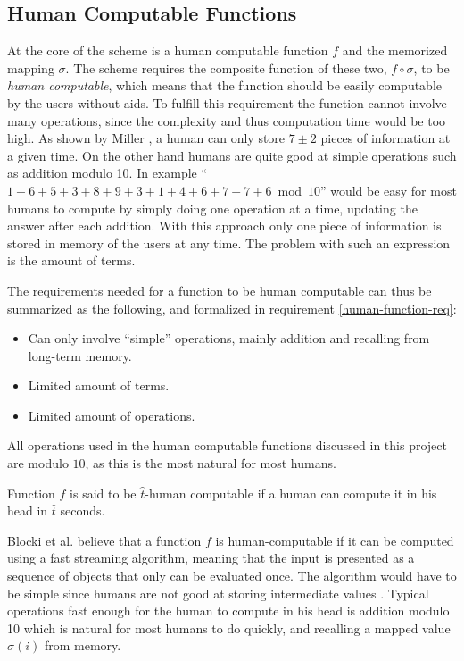 \subsection{Human Computable Functions}\label{human-func}
At the core of the scheme is a human computable function $f$ and the memorized mapping $\sigma$. The scheme requires the composite function of these two, $f \circ \sigma$, to be \emph{human computable}, which means that the function should be easily computable by the users without aids. To fulfill this requirement the function cannot involve many operations, since the complexity and thus computation time would be too high. As shown by Miller \cite{magic-seven_miller}, a human can only store $7 \pm 2$ pieces of information at a given time. On the other hand humans are quite good at simple operations such as addition modulo 10. In example ``$1+6+5+3+8+9+3+1+4+6+7+7+6 \bmod 10$'' would be easy for most humans to compute by simply doing one operation at a time, updating the answer after each addition. With this approach only one piece of information is stored in memory of the users at any time. The problem with such an expression is the amount of terms. 
\par The requirements needed for a function to be human computable can thus be summarized as the following, and formalized in requirement \ref{human-function-req}:
\begin{itemize}
    \item Can only involve ``simple'' operations, mainly addition and recalling from long-term memory.
    \item Limited amount of terms.
    \item Limited amount of operations.
\end{itemize}
\begin{remark}
    All operations used in the human computable functions discussed in this project are modulo $10$, as this is the most natural for most humans.
\end{remark}
\begin{requirement}
    \label{human-function-req}
    Function $f$ is said to be $\hat t$-human computable if a human can compute it in his head in $\hat t$ seconds.
\end{requirement}

\par Blocki et al. \cite{hcp-blocki} believe that a function $f$ is human-computable if it can be computed using a fast streaming algorithm, meaning that the input is presented as a sequence of objects that only can be evaluated once. The algorithm would have to be simple since humans are not good at storing intermediate values \cite{magic-seven_miller}. Typical operations fast enough for the human to compute in his head is addition modulo 10 which is natural for most humans to do quickly, and recalling a mapped value $\sigma(i)$ from memory.




